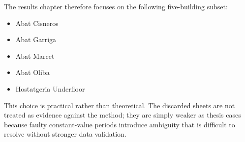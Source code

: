 The results chapter therefore focuses on the following five-building subset:

\begin{itemize}
\item Abat Cisneros
\item Abat Garriga
\item Abat Marcet
\item Abat Oliba
\item Hostatgeria Underfloor
\end{itemize}

This choice is practical rather than theoretical. The discarded sheets are not treated as evidence against the method; they are simply weaker as thesis cases because faulty constant-value periods introduce ambiguity that is difficult to resolve without stronger data validation.

